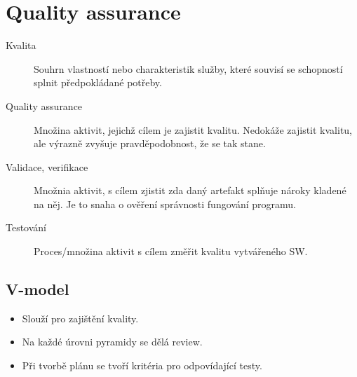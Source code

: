 \section{Quality assurance}
  \begin{description}
    \item[Kvalita] Souhrn vlastností nebo charakteristik služby, které souvisí se schopností splnit předpokládané potřeby.
    \item[Quality assurance] Množina aktivit, jejichž cílem je zajistit kvalitu. Nedokáže zajistit
    kvalitu, ale výrazně zvyšuje pravděpodobnost, že se tak stane.
    \item[Validace, verifikace] Množnia aktivit, s cílem zjistit zda daný artefakt splňuje nároky kladené na něj.
    Je to snaha o ověření správnosti fungování programu.
    \item[Testování] Proces/množina aktivit s cílem změřit kvalitu vytvářeného SW.
  \end{description}

  \subsection{V-model}
    \begin{itemize}
      \item Slouží pro zajištění kvality.
      \item Na každé úrovni pyramidy se dělá review.
      \item Při tvorbě plánu se tvoří kritéria pro odpovídající testy.
    \end{itemize}
